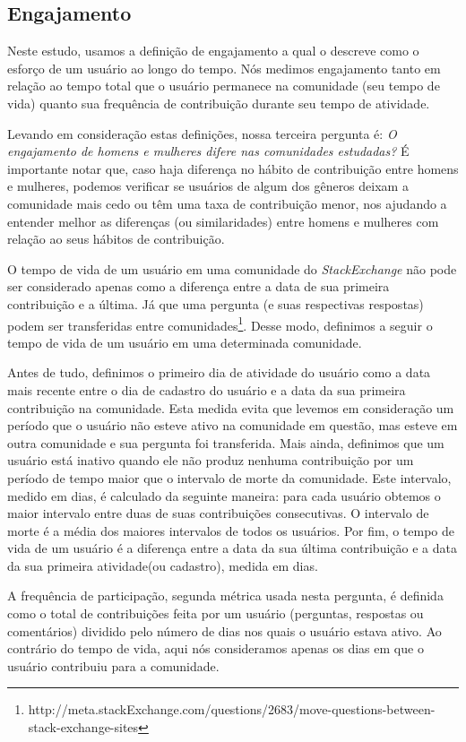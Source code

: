 \subsection{Engajamento}

Neste estudo, usamos a definição de engajamento a qual o descreve como o esforço de um usuário ao longo do tempo. Nós medimos engajamento tanto em relação ao tempo total que o usuário permanece na comunidade (seu tempo de vida) quanto sua frequência de contribuição durante seu tempo de atividade.

Levando em consideração estas definições, nossa terceira pergunta é: \textit{O engajamento de homens e mulheres difere nas comunidades estudadas?} É importante notar que, caso haja diferença no hábito de contribuição entre homens e mulheres, podemos verificar se usuários de algum dos gêneros deixam a comunidade mais cedo ou têm uma taxa de contribuição menor, nos ajudando a entender melhor as diferenças (ou similaridades) entre homens e mulheres com relação ao seus hábitos de contribuição.

O tempo de vida de um usuário em uma comunidade do \emph{StackExchange} não pode ser considerado apenas como a diferença entre a data de sua primeira contribuição e a última. Já que uma pergunta (e suas respectivas respostas) podem ser transferidas entre comunidades\footnote{http://meta.stackExchange.com/questions/2683/move-questions-between-stack-exchange-sites}. Desse modo, definimos a seguir o tempo de vida de um usuário em uma determinada comunidade. 

Antes de tudo, definimos o primeiro dia de atividade do usuário como a data mais recente entre o dia de cadastro do usuário e a data da sua primeira contribuição na comunidade. Esta medida evita que levemos em consideração um período que o usuário não esteve ativo na comunidade em questão, mas esteve em outra comunidade e sua pergunta foi transferida. Mais ainda, definimos que um usuário está inativo quando ele não produz nenhuma contribuição por um período de tempo maior que o intervalo de morte da comunidade. Este intervalo, medido em dias, é calculado da seguinte maneira: para cada usuário obtemos o maior intervalo entre duas de suas contribuições consecutivas. O intervalo de morte é a média dos maiores intervalos de todos os usuários. Por fim, o tempo de vida de um usuário é a diferença entre a data da sua última contribuição e a data da sua primeira atividade(ou cadastro), medida em dias.

A frequência de participação, segunda métrica usada nesta pergunta, é definida como o total de contribuições feita por um usuário (perguntas, respostas ou comentários) dividido pelo número de dias nos quais o usuário estava ativo. Ao contrário do tempo de vida, aqui nós consideramos apenas os dias em que o usuário contribuiu para a comunidade.

